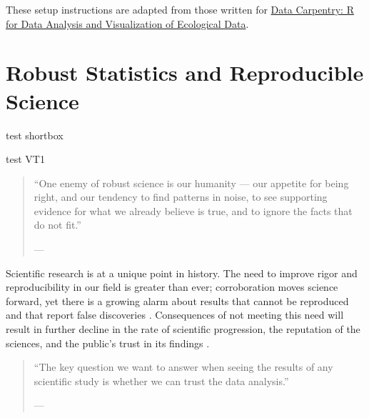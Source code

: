 \documentclass[12pt, krantz2,]{krantz}
\theoremstyle{definition}
\theoremstyle{definition}
\theoremstyle{definition}
\newcommand{\1}{\mathbbm{1}}
\begin{document}
These setup instructions are adapted from those written for \href{http://www.datacarpentry.org/R-ecology-lesson/}{Data Carpentry: R
for Data Analysis and Visualization of Ecological
Data}.

\hypertarget{robust}{%
\chapter{Robust Statistics and Reproducible Science}\label{robust}}

\begin{shortbox}
test shortbox
\end{shortbox}

\begin{VT1}
test VT1
\end{VT1}

\begin{quote}
``One enemy of robust science is our humanity --- our appetite for
being right, and our tendency to find patterns in noise, to see supporting
evidence for what we already believe is true, and to ignore the facts that do
not fit.''

--- \citet{naturenews_2015}
\end{quote}

Scientific research is at a unique point in history. The need to improve rigor
and reproducibility in our field is greater than ever; corroboration moves
science forward, yet there is a growing alarm about results that cannot be
reproduced and that report false discoveries \citep{baker2016there}. Consequences of
not meeting this need will result in further decline in the rate of scientific
progression, the reputation of the sciences, and the public's trust in its
findings \citep{munafo2017manifesto, naturenews2_2015}.

\begin{quote}
``The key question we want to answer when seeing the results of any scientific
study is whether we can trust the data analysis.''

--- \citet{peng2015reproducibility}
\end{quote}
\end{document}

